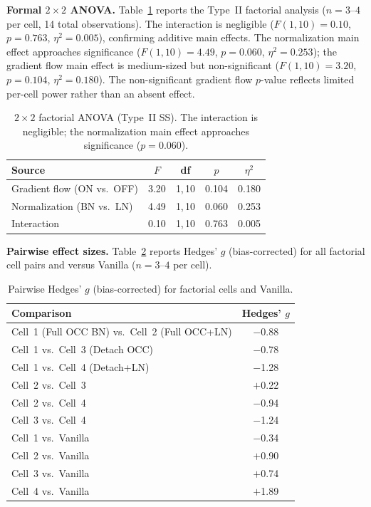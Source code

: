 \textbf{Formal $2{\times}2$ ANOVA.} Table~\ref{tab:anova} reports the Type~II factorial analysis ($n{=}3$--$4$ per cell, 14 total observations). The interaction is negligible ($F(1,10){=}0.10$, $p{=}0.763$, $\eta^2{=}0.005$), confirming additive main effects. The normalization main effect approaches significance ($F(1,10){=}4.49$, $p{=}0.060$, $\eta^2{=}0.253$); the gradient flow main effect is medium-sized but non-significant ($F(1,10){=}3.20$, $p{=}0.104$, $\eta^2{=}0.180$). The non-significant gradient flow $p$-value reflects limited per-cell power rather than an absent effect.

\begin{table}[h]
\centering
\caption{$2{\times}2$ factorial ANOVA (Type~II SS). The interaction is negligible; the normalization main effect approaches significance ($p{=}0.060$).}
\label{tab:anova}
\begin{tabular}{lcccc}
\toprule
Source & $F$ & df & $p$ & $\eta^2$ \\
\midrule
Gradient flow (ON vs.\ OFF) & 3.20 & 1,\,10 & 0.104 & 0.180 \\
Normalization (BN vs.\ LN) & 4.49 & 1,\,10 & 0.060 & 0.253 \\
Interaction & 0.10 & 1,\,10 & 0.763 & 0.005 \\
\bottomrule
\end{tabular}
\end{table}

\textbf{Pairwise effect sizes.} Table~\ref{tab:pairwise} reports Hedges' $g$ (bias-corrected) for all factorial cell pairs and versus Vanilla ($n{=}3$--$4$ per cell).

\begin{table}[h]
\centering
\caption{Pairwise Hedges' $g$ (bias-corrected) for factorial cells and Vanilla.}
\label{tab:pairwise}
\small
\begin{tabular}{lc}
\toprule
Comparison & Hedges' $g$ \\
\midrule
Cell~1 (Full OCC BN) vs.\ Cell~2 (Full OCC+LN) & $-$0.88 \\
Cell~1 vs.\ Cell~3 (Detach OCC) & $-$0.78 \\
Cell~1 vs.\ Cell~4 (Detach+LN) & $-$1.28 \\
Cell~2 vs.\ Cell~3 & $+$0.22 \\
Cell~2 vs.\ Cell~4 & $-$0.94 \\
Cell~3 vs.\ Cell~4 & $-$1.24 \\
\addlinespace
Cell~1 vs.\ Vanilla & $-$0.34 \\
Cell~2 vs.\ Vanilla & $+$0.90 \\
Cell~3 vs.\ Vanilla & $+$0.74 \\
Cell~4 vs.\ Vanilla & $+$1.89 \\
\bottomrule
\end{tabular}
\end{table}

